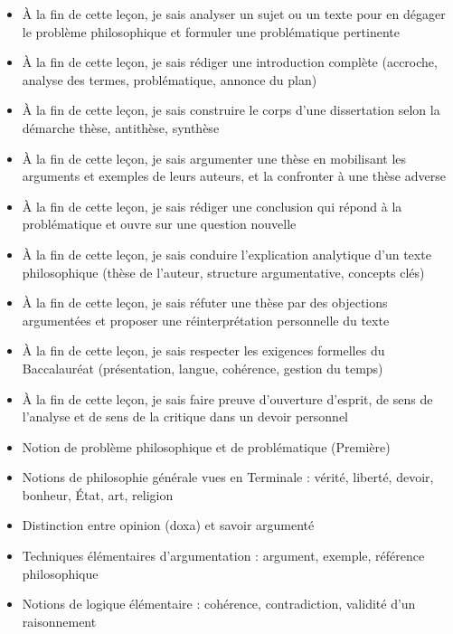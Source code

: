 \documentclass[11pt]{article}
\begin{document}
\begin{objectifs}
\begin{itemize}
\item À la fin de cette leçon, je sais analyser un sujet ou un texte pour en dégager le problème philosophique et formuler une problématique pertinente
\item À la fin de cette leçon, je sais rédiger une introduction complète (accroche, analyse des termes, problématique, annonce du plan)
\item À la fin de cette leçon, je sais construire le corps d'une dissertation selon la démarche thèse, antithèse, synthèse
\item À la fin de cette leçon, je sais argumenter une thèse en mobilisant les arguments et exemples de leurs auteurs, et la confronter à une thèse adverse
\item À la fin de cette leçon, je sais rédiger une conclusion qui répond à la problématique et ouvre sur une question nouvelle
\item À la fin de cette leçon, je sais conduire l'explication analytique d'un texte philosophique (thèse de l'auteur, structure argumentative, concepts clés)
\item À la fin de cette leçon, je sais réfuter une thèse par des objections argumentées et proposer une réinterprétation personnelle du texte
\item À la fin de cette leçon, je sais respecter les exigences formelles du Baccalauréat (présentation, langue, cohérence, gestion du temps)
\item À la fin de cette leçon, je sais faire preuve d'ouverture d'esprit, de sens de l'analyse et de sens de la critique dans un devoir personnel
\end{itemize}
\end{objectifs}

\begin{prerequis}
\begin{itemize}
\item Notion de problème philosophique et de problématique (Première)
\item Notions de philosophie générale vues en Terminale : vérité, liberté, devoir, bonheur, État, art, religion
\item Distinction entre opinion (doxa) et savoir argumenté
\item Techniques élémentaires d'argumentation : argument, exemple, référence philosophique
\item Notions de logique élémentaire : cohérence, contradiction, validité d'un raisonnement
\end{itemize}
\end{prerequis}
\end{document}
